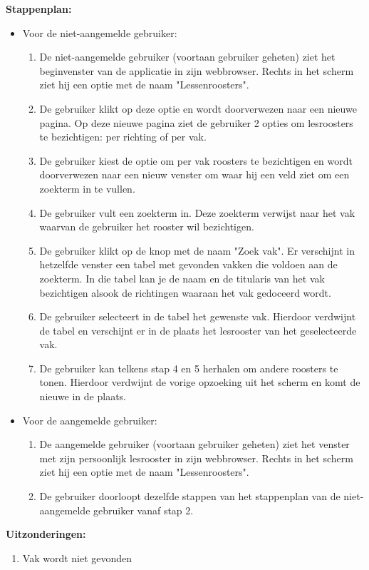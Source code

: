 \textbf{Stappenplan:}
\begin{itemize}
\item Voor de niet-aangemelde gebruiker: 
	\begin{enumerate}
		\item De niet-aangemelde gebruiker (voortaan gebruiker geheten) ziet het beginvenster van de applicatie in zijn webbrowser. Rechts in het scherm ziet hij een optie met de naam "Lessenroosters".
		\item De gebruiker klikt op deze optie en wordt doorverwezen naar een nieuwe pagina. Op deze nieuwe pagina ziet de gebruiker 2 opties om lesroosters te bezichtigen: per richting of per vak.
		\item De gebruiker kiest de optie om per vak roosters te bezichtigen en wordt doorverwezen naar een nieuw venster om waar hij een veld ziet om een zoekterm in te vullen.
		\item De gebruiker vult een zoekterm in. Deze zoekterm verwijst naar het vak waarvan de gebruiker het rooster wil bezichtigen.
		\item De gebruiker klikt op de knop met de naam "Zoek vak". Er verschijnt in hetzelfde venster een tabel met gevonden vakken die voldoen aan de zoekterm. In die tabel kan je de naam en de titularis van het vak bezichtigen alsook de richtingen waaraan het vak gedoceerd wordt.
		\item De gebruiker selecteert in de tabel het gewenste vak. Hierdoor verdwijnt de tabel en verschijnt er in de plaats het lesrooster van het geselecteerde vak.
		\item De gebruiker kan telkens stap 4 en 5 herhalen om andere roosters te tonen. Hierdoor verdwijnt de vorige opzoeking uit het scherm en komt de nieuwe in de plaats.
	\end{enumerate}
\item Voor de aangemelde gebruiker:
	\begin{enumerate}
	\item De aangemelde gebruiker (voortaan gebruiker geheten) ziet het venster met zijn persoonlijk lesrooster in zijn webbrowser. Rechts in het scherm ziet hij een optie met de naam "Lessenroosters".
	\item De gebruiker doorloopt dezelfde stappen van het stappenplan van de niet-aangemelde gebruiker vanaf stap 2.
	\end{enumerate}
\end{itemize}

\textbf{Uitzonderingen:}
\begin{enumerate}
\item Vak wordt niet gevonden
\end{enumerate}
        
